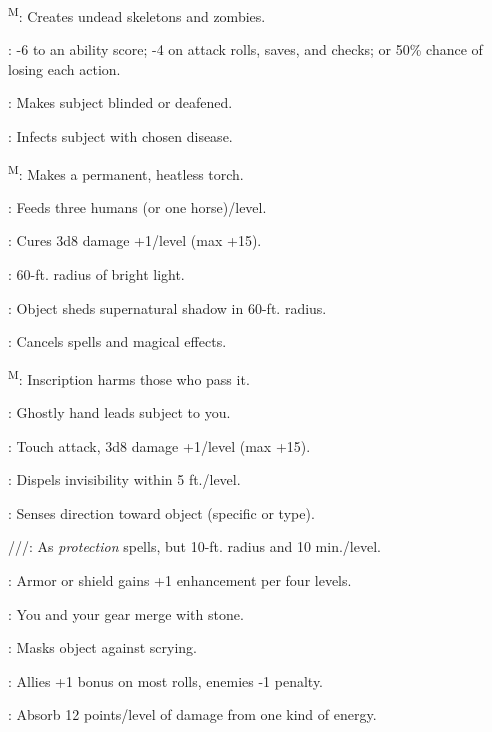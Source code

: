 \textsuperscript{M}: Creates undead skeletons and zombies.

: -6 to an ability score; -4 on attack rolls, saves, and checks; or 50\% chance of losing each action.

: Makes subject blinded or deafened.

: Infects subject with chosen disease.

\textsuperscript{M}: Makes a permanent, heatless torch.

: Feeds three humans (or one horse)/level.

: Cures 3d8 damage +1/level (max +15).

: 60-ft. radius of bright light.

: Object sheds supernatural shadow in 60-ft. radius.

: Cancels spells and magical effects.

\textsuperscript{M}: Inscription harms those who pass it.

: Ghostly hand leads subject to you.

: Touch attack, 3d8 damage +1/level (max +15).

: Dispels invisibility within 5 ft./level.

: Senses direction toward object (specific or type).

///: As \textit{protection} spells, but 10-ft. radius and 10 min./level.

: Armor or shield gains +1 enhancement per four levels.

: You and your gear merge with stone.

: Masks object against scrying.

: Allies +1 bonus on most rolls, enemies -1 penalty.

: Absorb 12 points/level of damage from one kind of energy.

